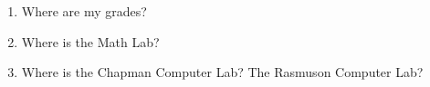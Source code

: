 \documentclass[11pt,fleqn]{article}
\begin{document}
\begin{enumerate}
\item Where are my grades?\\
\vfill

\item Where is the Math Lab?\\
\vfill

\item Where is the Chapman Computer Lab? The Rasmuson Computer Lab?\\
\vfill


\end{enumerate}
\end{document}
